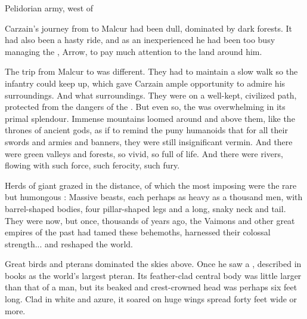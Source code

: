 \bookchapter{\Forklin}

\begin{comment}
\section{\Forklin}
\end{comment}

\begin{comment}
\subsection{The \Wylde{}}
\end{comment}

\stamp
  {\dateCarzainFirstInForklin}
  {Pelidorian army, west of \Forklin}

Carzain's journey from \Redglen{} to Malcur had been dull, dominated by dark forests. 
It had also been a hasty ride, and as an inexperienced \relcer{} he had been too busy managing the \relc, Arrow, to pay much attention to the land around him. 

The trip from Malcur to \Forklin{} was different. 
They had to maintain a slow walk so the infantry could keep up, which gave Carzain ample opportunity to admire his surroundings. 
And what surroundings. 
They were on a well-kept, civilized path, protected from the dangers of the \Wylde{}. 
But even so, the \Wylde{} was overwhelming in its primal splendour. 
Immense mountains loomed around and above them, like the thrones of ancient gods, as if to remind the puny humanoids that for all their swords and armies and banners, they were still insignificant vermin. 
And there were green valleys and forests, so vivid, so full of life. 
And there were rivers, flowing with such force, such ferocity, such fury. 

Herds of giant \saurians{} grazed in the distance, of which the most imposing were the rare but humongous \tondras{}: 
Massive beasts, each perhaps as heavy as a thousand men, with barrel-shaped bodies, four pillar-shaped legs and a long, snaky neck and tail. 
They were \Wylde{} now, but once, thousands of years ago, the Vaimons and other great empires of the past had tamed these behemoths, harnessed their colossal strength... and reshaped the world. 

Great birds and pterans dominated the skies above. 
Once he saw a \quilrai, described in books as the world's largest pteran. 
Its feather-clad central body was little larger than that of a man, but 
its beaked and crest-crowned head was perhaps six feet long. 
Clad in white and azure, it soared on huge wings spread forty feet wide or more. 

